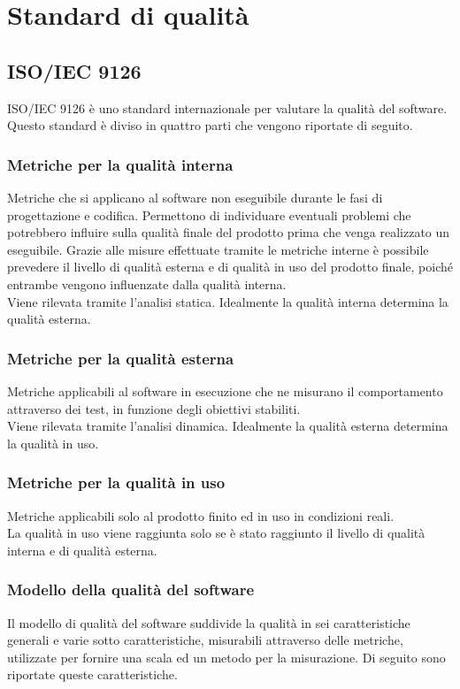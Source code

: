 \section{Standard di qualità}

	\subsection{ISO/IEC 9126}
	ISO/IEC 9126 è uno standard internazionale per valutare la qualità del software.\\%
	Questo standard è diviso in quattro parti che vengono riportate di seguito.
		\subsubsection{Metriche per la qualità interna}
		Metriche che si applicano al software non eseguibile durante le fasi di progettazione e codifica. Permettono di individuare eventuali problemi che potrebbero influire sulla qualità finale del prodotto prima che venga realizzato un eseguibile. Grazie alle misure effettuate tramite le metriche interne è possibile prevedere il livello di qualità esterna e di qualità in uso del prodotto finale, poiché entrambe vengono influenzate dalla qualità interna.\\
		Viene rilevata tramite l'analisi statica. Idealmente la qualità interna determina la qualità esterna.
		\subsubsection{Metriche per la qualità esterna}
		Metriche applicabili al software in esecuzione che ne misurano il comportamento attraverso dei test, in funzione degli obiettivi stabiliti.\\
		Viene rilevata tramite l'analisi dinamica. Idealmente la qualità esterna determina la qualità in uso.
		\subsubsection{Metriche per la qualità in uso}
		Metriche applicabili solo al prodotto finito ed in uso in condizioni reali.\\
		La qualità in uso viene raggiunta solo se è stato raggiunto il livello di qualità interna e di qualità esterna.
		\subsubsection{Modello della qualità del software}
		Il modello di qualità del software suddivide la qualità in sei caratteristiche generali e varie sotto caratteristiche, misurabili attraverso delle metriche, utilizzate per fornire una scala ed un metodo per la misurazione. Di seguito sono riportate queste caratteristiche.

